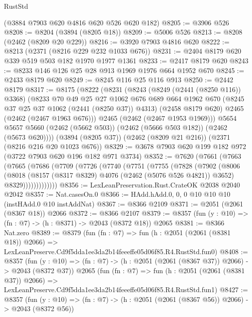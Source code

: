 \begin{lexlean}{RustStd}
\begin{coremodule}
    (@3884 @7903 @620 @4816 @620 @526 @620 @182)
@8205 := @3906 @526
@8208 := @8204 (@3894 (@8205 @18))
@8209 := @5006 @526
@8213 := @8208 (@2462 (@8209 @20 @229))
@8216 := @3920 @7903 @4816 @620
@8222 := @8213 (@2371 (@8216 @229 @232 @1033 @676))
@8231 := @2404 @8179 @620 @339 @519 @503 @182 @1970 @1977 @1361
@8233 := @2417 @8179 @620
@8243 := @8233 @146 @126 @25 @28 @913 @1969 @1976 @664 @1952 @670
@8245 := @2433 @8179 @620
@8249 := @8245 @116 @25 @116 @913
@8250 := @2442 @8179
@8317 := @8175
    (@8222
      (@8231
        (@8243
          (@8249 (@2441 (@8250 @116)) @3368)
          (@8233
            @70
            @49
            @25
            @27
            @1062
            @676
            @689
            @664
            @1962
            @670
            (@8245 @37 @25 @37 @1062 (@2441 (@8250 @37)) @4313)
            (@2458 @8179 @620)
            @2465
            (@2462 (@2467 @1963 @676)))
          @2465
          (@2462 (@2467 @1953 @1969)))
        @5654
        @5657
        @5660
        (@2462 (@5662 @503))
        (@2462 (@5666 @503 @182))
        (@2462 (@5673 @620))))
    (@3894 (@8205 @37))
    (@2462 (@8209 @21 @216))
    (@2371 (@8216 @216 @20 @1023 @676))
@8329 := @3678 @7903 @620 @199 @182 @972 (@3722 @7903 @620 @196 @182 @971 @3734)
@8352 := @7620
    (@7661
      (@7663
        (@7665
          (@7686
            (@7709
              (@7726
                (@7740
                  (@7751
                    (@7755
                      (@7828
                        (@7902
                          (@8006
                            (@8018
                              (@8157 (@8317 @8329) @4076 (@2462 (@5076 @526 @4821)) @3652)
                              @8329)))))))))))))
@8356 := LexLeanPreservation.Rust.CrateOK @2038 @2040 @2042
@8357 := Nat.casesOn.{0}
@8366 := HAdd.hAdd.{0, 0, 0} @10 @10 @10 (instHAdd.{0} @10 instAddNat)
@8367 := @8366 @2109
@8371 := @2051 (@2061 (@8367 @18)) @2066
@8372 := @8366 @2107
@8379 := @8357 (fun (y : @10) => (fn : @7) -> (h : @8371) -> @2043 (@8372 @18)) @2065
@8381 := @8366 Nat.zero
@8389 := @8379
    (fun (fn : @7) =>
    fun (h : @2051 (@2061 (@8381 @18)) @2066) =>
    LexLeanPreserve.Cd9f5dda1ee3da2b14feeeffe05d06f85.R4.RustStd.fun0)
@8408 := @8357
    (fun (y : @10) => (fn : @7) -> (h : @2051 (@2061 (@8367 @37)) @2066) -> @2043 (@8372 @37))
    @2065
    (fun (fn : @7) =>
    fun (h : @2051 (@2061 (@8381 @37)) @2066) =>
    LexLeanPreserve.Cd9f5dda1ee3da2b14feeeffe05d06f85.R4.RustStd.fun1)
@8427 := @8357
    (fun (y : @10) => (fn : @7) -> (h : @2051 (@2061 (@8367 @56)) @2066) -> @2043 (@8372 @56))

\end{coremodule}
\end{lexlean}
